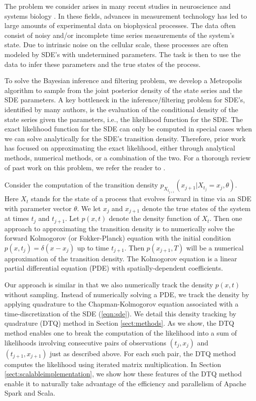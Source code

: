 \documentclass[wcp]{jmlr}
\begin{document}
The problem we consider arises in many recent studies in neuroscience 
\citep{Kneissler2015} and systems biology \citep{Sun2008}.  In
these fields, advances in measurement technology has led to
large amounts of experimental data on biophysical processes.  The data
often consist of noisy and/or incomplete time series measurements of the system's
state.  Due to intrinsic noise on the cellular scale, these processes are often
modeled by SDE's with undetermined parameters.  The task is then to
use the data to infer these parameters and the true states of the process. 

To solve the Bayesian inference and filtering problem, we develop a
Metropolis algorithm to sample from the joint posterior density of the
state series and the SDE parameters.  A key bottleneck in the
inference/filtering problem for SDE's, identified by many authors, is
the evaluation of the
conditional density of the state series given the parameters, i.e.,
the likelihood function for the SDE.  The exact likelihood function for the SDE can only be computed in 
special cases when we can solve analytically for the SDE's
transition density.  Therefore, prior work has focused on
approximating the exact likelihood, either through analytical methods,
numerical methods, or a combination of the two.  For a thorough review
of past work on this problem, we refer the reader to
\citet{chen2003, sorensen2004parametric, iacus2009simulation,
  barber2011bayesian, 
  fuchs2013inference}.  

Consider the
computation of the transition density $p_{X_{t_{j+1}}}(x_{j+1} |
X_{t_j} = x_j, \theta)$.  Here $X_t$ stands for the state of a process that evolves
forward in time via an SDE with parameter vector $\theta$.  We let
$x_j$ and $x_{j+1}$ denote the true states of the system at times
$t_j$ and $t_{j+1}$.  Let $p(x,t)$ denote the density function of $X_t$.  Then one approach
to approximating the transition density is to numerically solve the
forward Kolmogorov (or Fokker-Planck) equation with the initial
condition $p(x,t_j) = \delta(x-x_j)$ up to time $t_{j+1}$.  Then
$p(x_{j+1},T)$ will be a numerical approximation of the transition
density.  The Kolmogorov equation is a linear partial differential
equation (PDE) with spatially-dependent coefficients.

Our approach is similar in that we also numerically track the density
$p(x,t)$ without sampling.  Instead of numerically solving a PDE, we
track the density by applying quadrature to the Chapman-Kolmogorov
equation associated with a time-discretization of the SDE
(\ref{eqn:sde}). We detail this density tracking by quadrature (DTQ)
method in Section \ref{sect:methods}.  As we show, the DTQ method
enables one to break the computation of the likelihood into a sum of
likelihoods involving consecutive pairs of observations $(t_j,x_j)$
and $(t_{j+1},x_{j+1})$ just as described above.  For each such pair,
the DTQ method computes the likelihood using iterated matrix
multiplication.  In Section \ref{sect:scalableimplementation}, we show
how these features of the DTQ method enable it to
naturally take advantage of the efficiency and parallelism of Apache
Spark and Scala.
\end{document}
